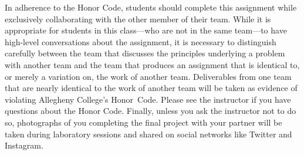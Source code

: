 In adherence to the Honor Code, students should complete this assignment while exclusively collaborating with the other
member of their team. While it is appropriate for students in this class---who are not in the same team---to have
high-level conversations about the assignment, it is necessary to distinguish carefully between the team that discusses
the principles underlying a problem with another team and the team that produces an assignment that is identical to, or
merely a variation on, the work of another team. Deliverables from one team that are nearly identical to the work of
another team will be taken as evidence of violating Allegheny College's \mbox{Honor Code}. Please see the instructor if
you have questions about the Honor Code. Finally, unless you ask the instructor not to do so, photographs of you
completing the final project with your partner will be taken during laboratory sessions and shared on social networks
like Twitter and Instagram.


